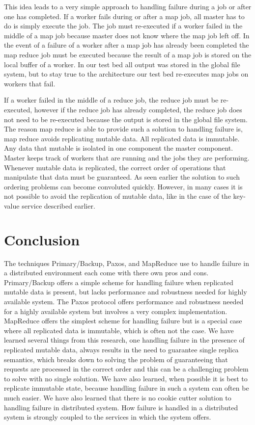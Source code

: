\documentclass[conference]{IEEEtran}
\begin{document}
This idea leads to a very simple approach to handling failure during a job or after one has completed. If a worker fails during or after a map job, all master has to do is simply execute the job. The job must re-executed if a worker failed in the middle of a map job because master does not know where the map job left off. In the event of a failure of a worker after a map job has already been completed the map reduce job must be executed because the result of a map job  is stored on the local buffer of a worker. In our test bed all output was stored in the global file system, but to stay true to the architecture our test bed re-executes map jobs on workers that fail. 

If a worker failed in the middle of a reduce job, the reduce job must be re-executed, however if the reduce job has already completed, the reduce job does not need to be re-executed because the output is stored in the global file system. The reason map reduce is able to provide such a solution to handling failure is, map reduce avoids replicating mutable data. All replicated data is immutable. Any data that mutable is isolated in one component the master component. Master keeps track of workers that are running and the jobs they are performing. Whenever mutable data is replicated, the correct order of operations that manipulate that data must be guaranteed. As seen earlier the solution to such ordering problems can become convoluted quickly. However, in many cases it is not possible to avoid the replication of mutable data, like in the case of the key-value service described earlier. 

\section{Conclusion}
The techniques Primary/Backup, Paxos, and MapReduce use to handle failure in a distributed environment each come with there own pros and cons. Primary/Backup offers a simple scheme for handling failure when replicated mutable data is present, but lacks performance and robustness needed for highly available system. The Paxos protocol offers performance and robustness needed for a highly available system but involves a very complex implementation. MapReduce offers the simplest scheme for handling failure but is a special case where all replicated data is immutable, which is often not the case. We have learned several things from this research, one handling failure in the presence of replicated mutable data, always results in the need to guarantee single replica semantics, which breaks down to solving the problem of guaranteeing that requests are processed in the correct order and this can be a challenging problem to solve with no single solution. We have also learned, when possible it is best to replicate immutable state, because handling failure in such a system can often be much easier. We have also learned that there is no cookie cutter solution to handling failure in distributed system. How failure is handled in a distributed system is strongly coupled to the services in which the system offers.
\end{document}

